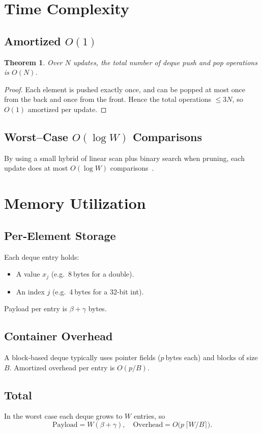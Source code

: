 \documentclass[11pt,letterpaper]{article}
\newtheorem{theorem}{Theorem}
\begin{document}
\section{Time Complexity}
\subsection{Amortized \(O(1)\)}
\begin{theorem}
Over \(N\) updates, the total number of deque push and pop operations is \(O(N)\).
\end{theorem}
\begin{proof}
Each element is pushed exactly once, and can be popped at most once from the back and once from the front.  Hence the total operations \(\le3N\), so \(O(1)\) amortized per update.
\end{proof}

\subsection{Worst–Case \(O(\log W)\) Comparisons}
By using a small hybrid of linear scan plus binary search when pruning, each update does at most \(O(\log W)\) comparisons~\cite{Lemire2006}.

\section{Memory Utilization}
\subsection{Per‐Element Storage}
Each deque entry holds:
\begin{itemize}
  \item A value \(x_j\) (e.g.\ 8 bytes for a double).
  \item An index \(j\) (e.g.\ 4 bytes for a 32-bit int).
\end{itemize}
Payload per entry is \(\beta+\gamma\) bytes.

\subsection{Container Overhead}
A block-based deque typically uses pointer fields (\(p\) bytes each) and blocks of size \(B\).  Amortized overhead per entry is \(O(p/B)\).

\subsection{Total}
In the worst case each deque grows to \(W\) entries, so  
\[
  \text{Payload} = W(\beta+\gamma),\quad
  \text{Overhead} = O\bigl(p\,\lceil W/B\rceil\bigr).
\]
\end{document}
